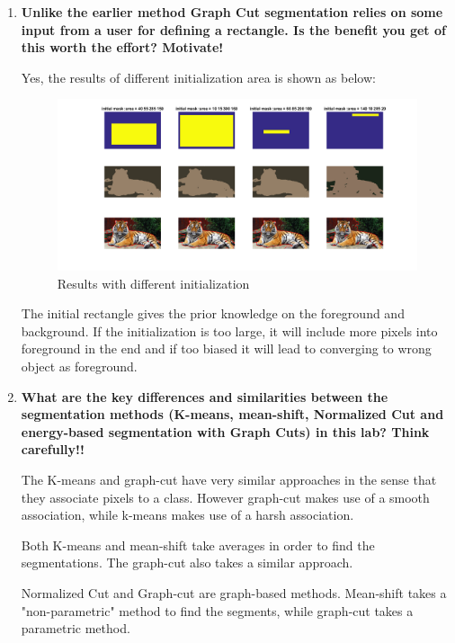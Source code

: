 \documentclass{article}
\begin{document}
\begin{enumerate}
    
    \item %
    \textbf{Unlike the earlier method Graph Cut segmentation relies on some input
from a user for defining a rectangle. Is the benefit you get of this worth the effort?
Motivate!}
\par
    Yes, the results of different initialization area is shown as below:
    \begin{figure}[H]
        \centering
        \includegraphics[width=1.2\linewidth]{graphcut_initialarea.png}
        \caption{Results with different initialization}
        \label{fig:513}
    \end{figure}
    The initial rectangle gives the prior knowledge on the foreground and background. If the initialization is too large, it will include more pixels into foreground in the end and if too biased it will lead to converging to wrong object as foreground.
    
    \item %
    \textbf{What are the key differences and similarities between the segmentation
methods (K-means, mean-shift, Normalized Cut and energy-based segmentation with
Graph Cuts) in this lab? Think carefully!!}

The K-means and graph-cut have very similar approaches in the sense that they associate pixels to a class. However graph-cut makes use of a smooth association, while k-means makes use of a harsh association.

Both K-means and mean-shift take averages in order to find the segmentations. The graph-cut also takes a similar approach.

Normalized Cut and Graph-cut are graph-based methods. Mean-shift takes a "non-parametric" method to find the segments, while graph-cut takes a parametric method.



\end{enumerate}
\end{document}
